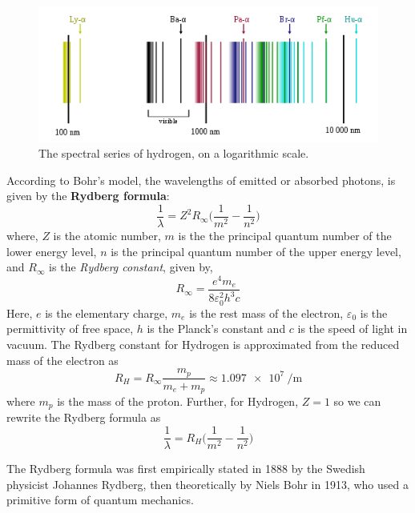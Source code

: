 \documentclass[%
 reprint,
 amsmath,amssymb,
 aps,
]{revtex4-2}
\begin{document}
    \begin{figure}
        \centering
        \includegraphics[scale = 0.8]{Figures/500px-Hydrogen_spectrum.svg.png}
        \caption{The spectral series of hydrogen, on a logarithmic scale.}
        \label{fig:specseries}
    \end{figure}
    \par
    According to Bohr's model, the wavelengths of emitted or absorbed photons, is given by the \textbf{Rydberg formula}:
    \begin{equation}
        \dfrac{1}{\lambda} = Z^2 R_{\infty} \Bigg(\dfrac{1}{m^2} - \dfrac{1}{n^2} \Bigg)
    \end{equation}
    where, $Z$ is the atomic number, $m$ is the the principal quantum number of the lower energy level, $n$ is the principal quantum number of the upper energy level, and $R_{\infty}$ is the \textit{Rydberg constant}, given by,
    \begin{equation}
        R_{\infty} = \dfrac{e^4 m_e}{8 \varepsilon_0^2 h^3 c}
    \end{equation}
    Here, $e$ is the elementary charge, $m_e$ is the rest mass of the electron, $\varepsilon_0$ is the permittivity of free space, $h$ is the Planck's constant and $c$ is the speed of light in vacuum. The Rydberg constant for Hydrogen is approximated from the reduced mass of the electron as
    \begin{equation}
        R_H = R_{\infty} \dfrac{m_p}{m_e + m_p} \approx \SI{1.097e7}{\per \metre}
    \end{equation}
    where $m_p$ is the mass of the proton. Further, for Hydrogen, $Z = 1$ so we can rewrite the Rydberg formula as
    \begin{equation}
    \label{eq4}
        \dfrac{1}{\lambda} = R_H \Bigg( \dfrac{1}{m^2} - \dfrac{1}{n^2} \Bigg)
    \end{equation}
    \par 
    The Rydberg formula was first empirically stated in 1888 by the Swedish physicist Johannes Rydberg, then theoretically by Niels Bohr in 1913, who used a primitive form of quantum mechanics.
\end{document}
